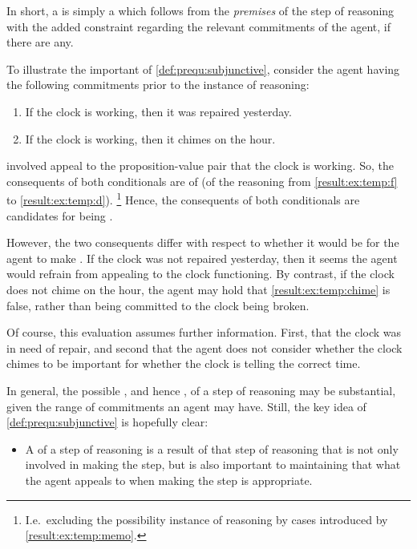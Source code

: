 \begin{note}
  In short, a  is simply a  which follows from the \emph{premises} of the step of reasoning with the added constraint regarding the relevant commitments of the agent, if there are any.
\end{note}

\begin{note}
  To illustrate the important of \ref{def:prequ:subjunctive}, consider the agent having the following commitments prior to the instance of reasoning:

  \begin{enumerate}[label=B\(^{+}\)\arabic*., ref=(B\(^{+}\)\arabic*)]
  \item
    \label{result:ex:temp:repair}
    If the clock is working, then it was repaired yesterday.
  \item
    \label{result:ex:temp:chime}
    If the clock is working, then it chimes on the hour.
  \end{enumerate}

  \CStepB{} involved appeal to the proposition-value pair that the clock is working.
  So, the consequents of both conditionals are  of \CStepB{} (of the reasoning from \ref{result:ex:temp:f} to \ref{result:ex:temp:d}).\nolinebreak
  \footnote{
    I.e.\ excluding the possibility instance of reasoning by cases introduced by \ref{result:ex:temp:memo}.
  }
  Hence, the consequents of both conditionals are candidates for being .

  However, the two consequents differ with respect to whether it would be \epAdv{} for the agent to make \CStepB{}.
  If the clock was not repaired yesterday, then it seems the agent would refrain from appealing to the clock functioning.
  By contrast, if the clock does not chime on the hour, the agent may hold that \ref{result:ex:temp:chime} is false, rather than being committed to the clock being broken.

  Of course, this evaluation assumes further information.
  First, that the clock was in need of repair, and second that the agent does not consider whether the clock chimes to be important for whether the clock is telling the correct time.

  In general, the possible , and hence , of a step of reasoning may be substantial, given the range of commitments an agent may have.
  Still, the key idea of \ref{def:prequ:subjunctive} is hopefully clear:
  \begin{itemize}
  \item
    A \prequ{} of a step of reasoning is a result of that step of reasoning that is not only involved in making the step, but is also important to maintaining that what the agent appeals to when making the step is appropriate.
  \end{itemize}
\end{note}

